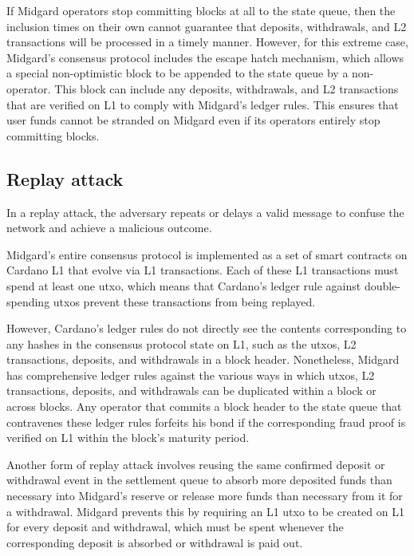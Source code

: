 \documentclass[../midgard.tex]{subfiles}
\begin{document}
If Midgard operators stop committing blocks at all to the state queue, then the inclusion times on their own cannot guarantee that deposits, withdrawals, and L2 transactions will be processed in a timely manner.
However, for this extreme case, Midgard's consensus protocol includes the escape hatch mechanism, which allows a special non-optimistic block to be appended to the state queue by a non-operator.
This block can include any deposits, withdrawals, and L2 transactions that are verified on L1 to comply with Midgard's ledger rules.
This ensures that user funds cannot be stranded on Midgard even if its operators entirely stop committing blocks.

\subsection{Replay attack}
\label{h:replay-attack}

In a replay attack, the adversary repeats or delays a valid message to confuse the network and achieve a malicious outcome.

Midgard's entire consensus protocol is implemented as a set of smart contracts on Cardano L1 that evolve via L1 transactions.
Each of these L1 transactions must spend at least one utxo, which means that Cardano's ledger rule against double-spending utxos prevent these transactions from being replayed.

However, Cardano's ledger rules do not directly see the contents corresponding to any hashes in the consensus protocol state on L1, such as the utxos, L2 transactions, deposits, and withdrawals in a block header.
Nonetheless, Midgard has comprehensive ledger rules against the various ways in which utxos, L2 transactions, deposits, and withdrawals can be duplicated within a block or across blocks.
Any operator that commits a block header to the state queue that contravenes these ledger rules forfeits his bond if the corresponding fraud proof is verified on L1 within the block's maturity period.

Another form of replay attack involves reusing the same confirmed deposit or withdrawal event in the settlement queue to absorb more deposited funds than necessary into Midgard's reserve or release more funds than necessary from it for a withdrawal.
Midgard prevents this by requiring an L1 utxo to be created on L1 for every deposit and withdrawal, which must be spent whenever the corresponding deposit is absorbed or withdrawal is paid out.
\end{document}

